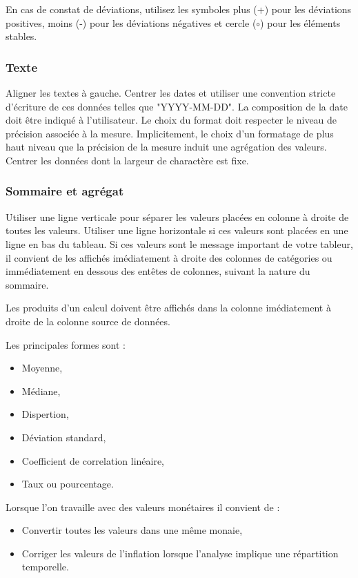 \documentclass[a4paper,12pt]{article}
\begin{document}
\begin{multicols}{2}
En cas de constat de déviations, utilisez les symboles plus (+) pour les déviations positives, moins (-) pour les déviations négatives et cercle (\(\circ\)) pour les éléments stables. \autocite{andreaskrauseBestPracticesData2024}
\subsubsection{Texte}
\label{sec:orgf2e4c73}
Aligner les textes à gauche.
Centrer les dates et utiliser une convention stricte d'écriture de ces données telles que "YYYY-MM-DD". \autocite{DateHeureRepresentations2019} La composition de la date doit être indiqué à l'utilisateur. Le choix du format doit respecter le niveau de précision associée à la mesure. Implicitement, le choix d'un formatage de plus haut niveau que la précision de la mesure induit une agrégation des valeurs.
Centrer les données dont la largeur de charactère est fixe.
\subsubsection{Sommaire et agrégat}
\label{sec:orgfe1bee9}
Utiliser une ligne verticale pour séparer les valeurs placées en colonne à droite de toutes les valeurs.
Utiliser une ligne horizontale si ces valeurs sont placées en une ligne en bas du tableau.
Si ces valeurs sont le message important de votre tableur, il convient de les affichés imédiatement à droite des colonnes de catégories ou immédiatement en dessous des entêtes de colonnes, suivant la nature du sommaire.

Les produits d'un calcul doivent être affichés dans la colonne imédiatement à droite de la colonne source de données.

Les principales formes sont :
\begin{itemize}
\item Moyenne,
\item Médiane,
\item Dispertion,
\item Déviation standard,
\item Coefficient de correlation linéaire,
\item Taux ou pourcentage.
\end{itemize}

Lorsque l'on travaille avec des valeurs monétaires il convient de :
\begin{itemize}
\item Convertir toutes les valeurs dans une même monaie,
\item Corriger les valeurs de l'inflation lorsque l'analyse implique une répartition temporelle.
\end{itemize}

\end{multicols}
\end{document}
